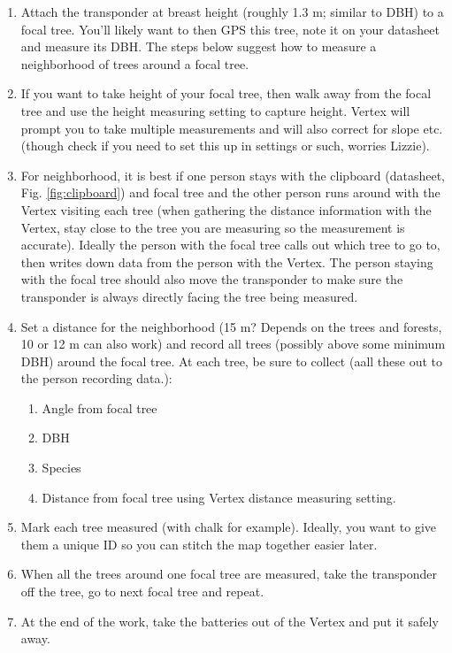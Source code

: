\documentclass[11pt]{article}
\begin{document}
\clearpage
\begin{enumerate}
\item Attach the transponder at breast height (roughly 1.3 m; similar to DBH) to a focal tree. You'll likely want to then GPS this tree, note it on your datasheet and measure its DBH. The steps below suggest how to measure a neighborhood of trees around a focal tree. 
\item If you want to take height of your focal tree, then walk away from the focal tree and use the height measuring setting to capture height. Vertex will prompt you to take multiple measurements and will also correct for slope etc. (though check if you need to set this up in settings or such, worries Lizzie). 
\item For neighborhood, it is best if one person stays with the clipboard (datasheet, Fig. \ref{fig:clipboard}) and focal tree and the other person runs around with the Vertex visiting each tree (when gathering the distance information with the Vertex, stay close to the tree you are measuring so the measurement is accurate). Ideally the person with the focal tree calls out which tree to go to, then writes down data from the person with the Vertex. The person staying with the focal tree should also move the transponder to make sure the transponder is always directly facing the tree being measured.
\item Set a distance for the neighborhood (15 m? Depends on the trees and forests, 10 or 12 m can also work) and record all trees (possibly above some minimum DBH) around the focal tree. At each tree, be sure to collect (aall these out to the person recording data.):
\begin{enumerate}
\item Angle from focal tree
\item DBH 
\item Species
\item Distance from focal tree using Vertex distance measuring setting.  
\end{enumerate}
\item Mark each tree measured (with chalk for example). Ideally, you want to give them a unique ID so you can stitch the map together easier later.
\item When all the trees around one focal tree are measured, take the transponder off the tree, go to next focal tree and repeat.
\item At the end of the work, take the batteries out of the Vertex and put it safely away. 
\end{enumerate}
\end{document}
